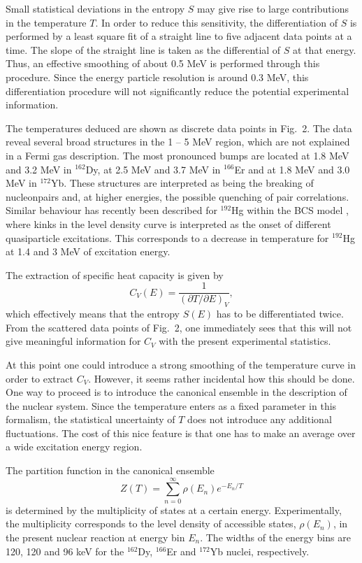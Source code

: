Small statistical deviations in the entropy $S$ may give rise to large
contributions in the temperature $T$. In order to reduce this sensitivity,
the differentiation of $S$ is performed by a least square fit of a straight
line to five adjacent data points at a time. The slope of the straight line
is taken as the differential of $S$ at that energy. Thus, an effective
smoothing of about 0.5 MeV is performed through this procedure. Since the
energy particle resolution is around 0.3 MeV, this differentiation
procedure will not significantly reduce the potential experimental
information.

The temperatures deduced are shown as discrete data points in Fig.~2. The
data reveal several broad structures in the 1 -- 5 MeV region, which are
not explained in a Fermi gas description. The most pronounced bumps are
located at 1.8 MeV and 3.2 MeV in $^{162}$Dy, at 2.5 MeV and 3.7 MeV in
$^{166}$Er and at 1.8 MeV and 3.0 MeV in $^{172}$Yb. These structures are
interpreted as being the breaking of nucleonpairs and, at higher energies,
the possible quenching of pair correlations. Similar behaviour has recently
been described for $^{192}$Hg within the BCS model \cite{13}, where kinks
in the level density curve is interpreted as the onset of different
quasiparticle excitations. This corresponds to a decrease in temperature
for $^{192}$Hg at 1.4 and 3 MeV of excitation energy.

The extraction of specific heat capacity is given by \begin{equation}
C_V(E) =\frac{1}{(\partial T/\partial E)_V}, \end{equation}
which effectively means that the entropy $S(E)$ has to be differentiated
twice. From the scattered data points of Fig.~2, one immediately sees that
this will not give meaningful information for $C_V$ with the present
experimental statistics.

At this point one could introduce a strong smoothing of the temperature
curve in order to extract $C_V$. However, it seems rather incidental how
this should be done. One way to proceed is to introduce the canonical
ensemble in the description of the nuclear system. Since the temperature
enters as a fixed parameter in this formalism, the statistical uncertainty
of $T$ does not introduce any additional fluctuations. The cost of this
nice feature is that one has to make an average over a wide excitation
energy region.

The partition function in the canonical ensemble \begin{equation}
Z(T)=\sum_{n=0}^{\infty}\rho (E_n)e^{-E_n/T} \end{equation}
is determined by the multiplicity of states at a certain energy.
Experimentally, the multiplicity corresponds to the level density of
accessible states, $\rho(E_n)$, in the present nuclear reaction at energy
bin $E_n$. The widths of the energy bins are 120, 120 and 96 keV for the
$^{162}$Dy, $^{166}$Er and $^{172}$Yb nuclei, respectively.

